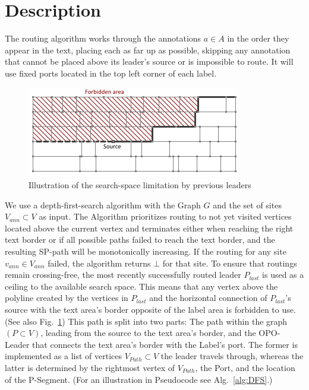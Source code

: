 \documentclass[11pt,a4paper]{vutinfth}
\begin{document}
\section{Description}
\label{sec:AlgDesc}

The routing algorithm works through the annotations $a \in A$ in the order they appear in the text, placing each as far up as possible, skipping any annotation that cannot be placed above its leader's source or is impossible to route. It will use fixed ports located in the top left corner of each label.

\begin{figure}
	\captionsetup{justification=centering, margin=0.75cm}
	\centering
	\includegraphics[scale=1]{Ceiling.png}
	\caption{Illustration of the search-space limitation by previous leaders}
	\label{fig:ceil}
\end{figure}

We use a depth-first-search algorithm with the Graph $G$ and the set of sites $V_{ann} \subset V$ as input. The Algorithm prioritizes routing to not yet visited vertices located above the current vertex and terminates either when reaching the right text border or if all possible paths failed to reach the text border, and the resulting SP-path will be monotonically increasing. If the routing for any site $v_{ann} \in V_{ann}$ failed, the algorithm returns $\bot$ for that site. To ensure that routings remain crossing-free, the most recently successfully routed leader $P_{last}$ is used as a ceiling to the available search space. This means that any vertex above the polyline created by the vertices in $P_{last}$ and the horizontal connection of $P_{last}$'s source with the text area's border opposite of the label area is forbidden to use. (See also Fig.~\ref*{fig:ceil}) This path is split into two parts: The path within the graph $(P \subset V)$, leading from the source to the text area's border, and the OPO-Leader that connects the text area's border with the Label's port. The former is implemented as a list of vertices $V_{Path} \subset V$ the leader travels through, whereas the latter is determined by the rightmost vertex of $V_{Path}$, the Port, and the location of the P-Segment. (For an illustration in Pseudocode see Alg.~\ref*{alg:DFS}.)
\end{document}
